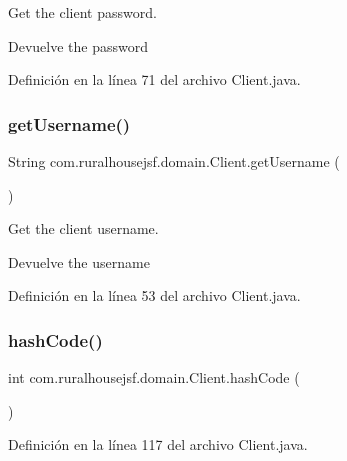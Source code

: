 Get the client password.

\begin{DoxyReturn}{Devuelve}
the password 
\end{DoxyReturn}


Definición en la línea 71 del archivo Client.\+java.

\mbox{\label{classcom_1_1ruralhousejsf_1_1domain_1_1_client_a0ae33acded961afcf93152d917bf1aa1}} 
\subsubsection{\texorpdfstring{getUsername()}{getUsername()}}
{\footnotesize\ttfamily String com.\+ruralhousejsf.\+domain.\+Client.\+get\+Username (\begin{DoxyParamCaption}{ }\end{DoxyParamCaption})}

Get the client username.

\begin{DoxyReturn}{Devuelve}
the username 
\end{DoxyReturn}


Definición en la línea 53 del archivo Client.\+java.

\mbox{\label{classcom_1_1ruralhousejsf_1_1domain_1_1_client_aaa86bcfe5247f3aeae9daec9600cf70c}} 
\subsubsection{\texorpdfstring{hashCode()}{hashCode()}}
{\footnotesize\ttfamily int com.\+ruralhousejsf.\+domain.\+Client.\+hash\+Code (\begin{DoxyParamCaption}{ }\end{DoxyParamCaption})}



Definición en la línea 117 del archivo Client.\+java.

\mbox{\label{classcom_1_1ruralhousejsf_1_1domain_1_1_client_a0e4914e375b61e50427b5fbd15c0948f}} 
